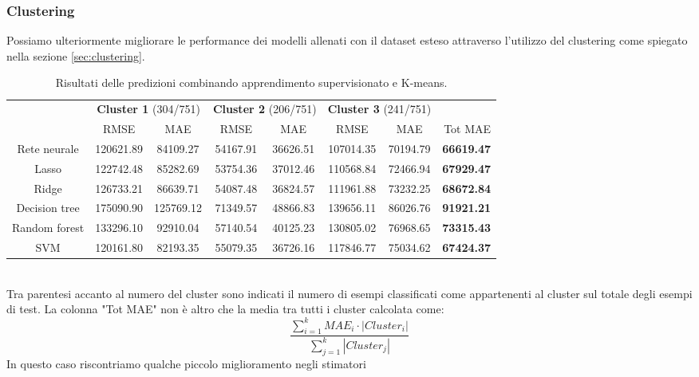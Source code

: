 \documentclass{article}
\begin{document}
\subsubsection{Clustering}
Possiamo ulteriormente migliorare le performance dei modelli allenati con il
dataset esteso attraverso l'utilizzo del clustering come spiegato nella sezione
\ref{sec:clustering}.
\begin{table}[ht]
	\small
	\centering
	\begin{tabular}{c|c|c|c|c|c|c|r|}
		\cline{2-8}
		& \multicolumn{2}{|c}{\textbf{Cluster 1} (304/751)}
		& \multicolumn{2}{|c|}{\textbf{Cluster 2} (206/751)}
		& \multicolumn{2}{c|}{\textbf{Cluster 3} (241/751)} & \\
		\cline{2-7}
		& RMSE & MAE & RMSE & MAE & RMSE & MAE & Tot MAE \\
		\hline
		\multicolumn{1}{|c|}{Rete neurale} & 120621.89 & 84109.27 & 54167.91 &
		36626.51 & 107014.35 & 70194.79 & \textbf{66619.47}\\
		\hline
		\multicolumn{1}{|c|}{Lasso}	& 122742.48 & 85282.69 & 53754.36 &
		37012.46 & 110568.84 & 72466.94 & \textbf{67929.47}\\
		\hline
		\multicolumn{1}{|c|}{Ridge} & 126733.21 & 86639.71 & 54087.48 &
		36824.57 & 111961.88 & 73232.25 & \textbf{68672.84}\\
		\hline
		\multicolumn{1}{|c|}{Decision tree} & 175090.90 & 125769.12 & 71349.57 &
		48866.83 & 139656.11 & 86026.76 & \textbf{91921.21}\\
		\hline
		\multicolumn{1}{|c|}{Random forest} & 133296.10 & 92910.04 & 57140.54 &
		40125.23 & 130805.02 & 76968.65 & \textbf{73315.43}\\
		\hline
		\multicolumn{1}{|c|}{SVM} & 120161.80 & 82193.35 & 55079.35 &
		36726.16 & 117846.77 & 75034.62 & \textbf{67424.37}\\
		\hline
	\end{tabular}
	\caption{Risultati delle predizioni combinando apprendimento supervisionato
	e K-means.}
\end{table}
\\
Tra parentesi accanto al numero del cluster sono indicati il numero di esempi
classificati come appartenenti al cluster sul totale degli esempi di test. 
La colonna "Tot MAE" non è altro che la media tra tutti i cluster calcolata
come:
\begin{equation}
	\frac{\sum_{i=1}^k MAE_i \cdot |Cluster_i|}{\sum_{j=1}^k |Cluster_j|}
\end{equation}
In questo caso riscontriamo qualche piccolo miglioramento negli stimatori
\end{document}
